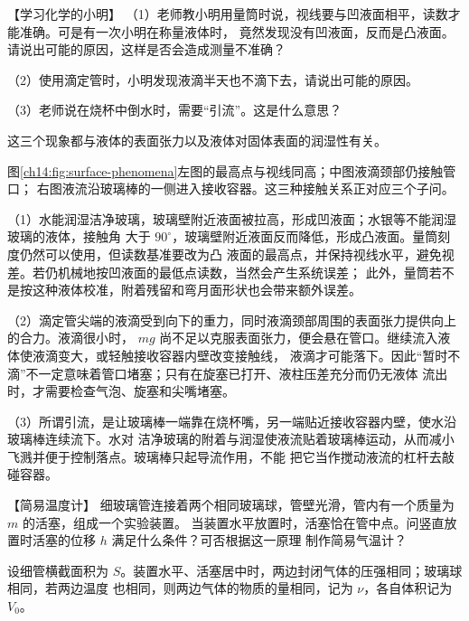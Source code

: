 {\begin{origexamplebox}{【学习化学的小明】}
（1）老师教小明用量筒时说，视线要与凹液面相平，读数才能准确。可是有一次小明在称量液体时，
竟然发现没有凹液面，反而是凸液面。请说出可能的原因，这样是否会造成测量不准确？

（2）使用滴定管时，小明发现液滴半天也不滴下去，请说出可能的原因。

（3）老师说在烧杯中倒水时，需要“引流”。这是什么意思？

\ThQMeniscus
\end{origexamplebox}

\begin{xesolution}
这三个现象都与液体的表面张力以及液体对固体表面的润湿性有关。

图\ref{ch14:fig:surface-phenomena}左图的最高点与视线同高；中图液滴颈部仍接触管口；
右图液流沿玻璃棒的一侧进入接收容器。这三种接触关系正对应三个子问。
\surfacePhenomenaDiagram

（1）水能润湿洁净玻璃，玻璃壁附近液面被拉高，形成凹液面；水银等不能润湿玻璃的液体，接触角
大于 $90^\circ$，玻璃壁附近液面反而降低，形成凸液面。量筒刻度仍然可以使用，但读数基准要改为凸
液面的最高点，并保持视线水平，避免视差。若仍机械地按凹液面的最低点读数，当然会产生系统误差；
此外，量筒若不是按这种液体校准，附着残留和弯月面形状也会带来额外误差。

（2）滴定管尖端的液滴受到向下的重力，同时液滴颈部周围的表面张力提供向上的合力。液滴很小时，
$mg$ 尚不足以克服表面张力，便会悬在管口。继续流入液体使液滴变大，或轻触接收容器内壁改变接触线，
液滴才可能落下。因此“暂时不滴”不一定意味着管口堵塞；只有在旋塞已打开、液柱压差充分而仍无液体
流出时，才需要检查气泡、旋塞和尖嘴堵塞。

（3）所谓引流，是让玻璃棒一端靠在烧杯嘴，另一端贴近接收容器内壁，使水沿玻璃棒连续流下。水对
洁净玻璃的附着与润湿使液流贴着玻璃棒运动，从而减小飞溅并便于控制落点。玻璃棒只起导流作用，不能
把它当作搅动液流的杠杆去敲碰容器。
\end{xesolution}

\begin{origexamplebox}{【简易温度计】}\label{ch14:ex:s28-19-4}
细玻璃管连接着两个相同玻璃球，管壁光滑，管内有一个质量为 $m$ 的活塞，组成一个实验装置。
当装置水平放置时，活塞恰在管中点。问竖直放置时活塞的位移 $h$ 满足什么条件？可否根据这一原理
制作简易气温计？

\ThQGasThermometer
\end{origexamplebox}

\begin{xesolution}
设细管横截面积为 $S$。装置水平、活塞居中时，两边封闭气体的压强相同；玻璃球相同，若两边温度
也相同，则两边气体的物质的量相同，记为 $\nu$，各自体积记为 $V_0$。


\end{xesolution}}
